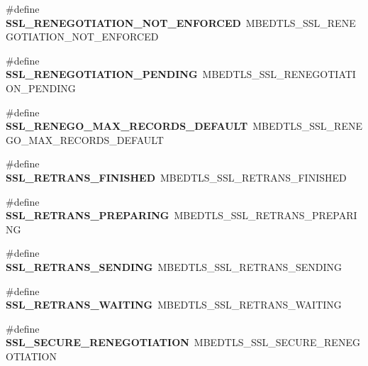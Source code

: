 \begin{DoxyCompactItemize}
\#define {\bfseries S\+S\+L\+\_\+\+R\+E\+N\+E\+G\+O\+T\+I\+A\+T\+I\+O\+N\+\_\+\+N\+O\+T\+\_\+\+E\+N\+F\+O\+R\+C\+ED}~M\+B\+E\+D\+T\+L\+S\+\_\+\+S\+S\+L\+\_\+\+R\+E\+N\+E\+G\+O\+T\+I\+A\+T\+I\+O\+N\+\_\+\+N\+O\+T\+\_\+\+E\+N\+F\+O\+R\+C\+ED
\item 
\mbox{\label{compat-1_83_8h_a22b6a89d4fcdfdc634d1f14bb7d19e50}} 
\#define {\bfseries S\+S\+L\+\_\+\+R\+E\+N\+E\+G\+O\+T\+I\+A\+T\+I\+O\+N\+\_\+\+P\+E\+N\+D\+I\+NG}~M\+B\+E\+D\+T\+L\+S\+\_\+\+S\+S\+L\+\_\+\+R\+E\+N\+E\+G\+O\+T\+I\+A\+T\+I\+O\+N\+\_\+\+P\+E\+N\+D\+I\+NG
\item 
\mbox{\label{compat-1_83_8h_a345b3de11c3837d161cc3fea122a8d4f}} 
\#define {\bfseries S\+S\+L\+\_\+\+R\+E\+N\+E\+G\+O\+\_\+\+M\+A\+X\+\_\+\+R\+E\+C\+O\+R\+D\+S\+\_\+\+D\+E\+F\+A\+U\+LT}~M\+B\+E\+D\+T\+L\+S\+\_\+\+S\+S\+L\+\_\+\+R\+E\+N\+E\+G\+O\+\_\+\+M\+A\+X\+\_\+\+R\+E\+C\+O\+R\+D\+S\+\_\+\+D\+E\+F\+A\+U\+LT
\item 
\mbox{\label{compat-1_83_8h_ad3513ce3b7cbc987d6efe517f275f6d1}} 
\#define {\bfseries S\+S\+L\+\_\+\+R\+E\+T\+R\+A\+N\+S\+\_\+\+F\+I\+N\+I\+S\+H\+ED}~M\+B\+E\+D\+T\+L\+S\+\_\+\+S\+S\+L\+\_\+\+R\+E\+T\+R\+A\+N\+S\+\_\+\+F\+I\+N\+I\+S\+H\+ED
\item 
\mbox{\label{compat-1_83_8h_a9882ebd42973aea2a20eb336d9305184}} 
\#define {\bfseries S\+S\+L\+\_\+\+R\+E\+T\+R\+A\+N\+S\+\_\+\+P\+R\+E\+P\+A\+R\+I\+NG}~M\+B\+E\+D\+T\+L\+S\+\_\+\+S\+S\+L\+\_\+\+R\+E\+T\+R\+A\+N\+S\+\_\+\+P\+R\+E\+P\+A\+R\+I\+NG
\item 
\mbox{\label{compat-1_83_8h_a1b9be0ebe8dfbd3bbf3a1728e7e3b67e}} 
\#define {\bfseries S\+S\+L\+\_\+\+R\+E\+T\+R\+A\+N\+S\+\_\+\+S\+E\+N\+D\+I\+NG}~M\+B\+E\+D\+T\+L\+S\+\_\+\+S\+S\+L\+\_\+\+R\+E\+T\+R\+A\+N\+S\+\_\+\+S\+E\+N\+D\+I\+NG
\item 
\mbox{\label{compat-1_83_8h_a8789483803f2041da0b0ee305b29103f}} 
\#define {\bfseries S\+S\+L\+\_\+\+R\+E\+T\+R\+A\+N\+S\+\_\+\+W\+A\+I\+T\+I\+NG}~M\+B\+E\+D\+T\+L\+S\+\_\+\+S\+S\+L\+\_\+\+R\+E\+T\+R\+A\+N\+S\+\_\+\+W\+A\+I\+T\+I\+NG
\item 
\mbox{\label{compat-1_83_8h_a3b2194c4a00cf137d99c90859838c7e5}} 
\#define {\bfseries S\+S\+L\+\_\+\+S\+E\+C\+U\+R\+E\+\_\+\+R\+E\+N\+E\+G\+O\+T\+I\+A\+T\+I\+ON}~M\+B\+E\+D\+T\+L\+S\+\_\+\+S\+S\+L\+\_\+\+S\+E\+C\+U\+R\+E\+\_\+\+R\+E\+N\+E\+G\+O\+T\+I\+A\+T\+I\+ON

\end{DoxyCompactItemize}
